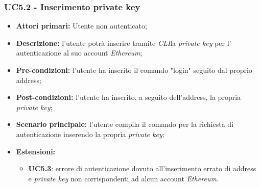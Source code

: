 \subsubsection{UC5.2 - Inserimento private key\glo}
\begin{itemize}
	\item \textbf{Attori primari:} Utente non autenticato;
	\item \textbf{Descrizione:} l'utente potrà inserire tramite \textit{CLI\glos}la \textit{private key\glo} per l' autenticazione al suo account \textit{Ethereum\glos}; 
	\item \textbf{Pre-condizioni:} l'utente ha inserito il comando "login" seguito dal proprio address;
	\item \textbf{Post-condizioni:} l'utente ha inserito, a seguito dell'address, la propria \textit{private key\glos};
	\item \textbf{Scenario principale:} l'utente compila il comando per la richiesta di autenticazione inserendo la propria \textit{private key\glos};
	\item \textbf{Estensioni:} 
	\begin{itemize}
		\item \textbf{UC5.3}: errore di autenticazione dovuto all'inserimento errato di address e \textit{private key\glo} non corrispondenti ad alcun account \textit{Ethereum\glos}.
	\end{itemize}
\end{itemize}